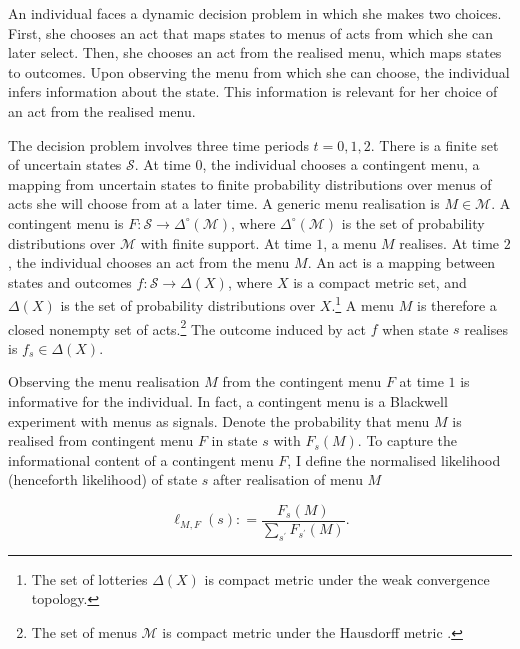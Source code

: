 An individual faces a dynamic decision problem in which she makes two choices. First, she chooses an act that maps states to menus of acts from which she can later select. Then, she chooses an act from the realised menu, which maps states to outcomes. Upon observing the menu from which she can choose, the individual infers information about the state. This information is relevant for her choice of an act from the realised menu.

The decision problem involves three time periods \( t = 0,1,2 \). There is a finite set of uncertain states \( \mathcal{S} \). At time \( 0 \), the individual chooses a contingent menu, a mapping from uncertain states to finite probability distributions over menus of acts she will choose from at a later time. A generic menu realisation is \( M \in \mathcal{M} \). A contingent menu is \( F: \mathcal{S} \rightarrow \Delta^{\circ} \left( \mathcal{M} \right) \), where \( \Delta^{\circ} \left( \mathcal{M} \right) \) is the set of probability distributions over \( \mathcal{M} \) with finite support. At time \( 1 \), a menu \( M \) realises. At time \( 2 \), the individual chooses an act from the menu \( M \). An act is a mapping between states and outcomes \( f : \mathcal{S} \rightarrow \Delta \left( X \right) \), where \( X \) is a compact metric set, and \( \Delta \left( X \right) \) is the set of probability distributions over \( X \).\footnote{The set of lotteries \(\Delta \left( X \right)\) is compact metric under the weak convergence topology.} A menu \( M \) is therefore a closed nonempty set of acts.\footnote{The set of menus \(\mathcal{M}\) is compact metric under the Hausdorff metric \citep[Theorem 3.85]{aliprantisInfiniteDimensionalAnalysis2006}.} The outcome induced by act \( f \) when state \( s \) realises is \( f_s \in \Delta \left( X \right) \).

Observing the menu realisation \( M \) from the contingent menu \( F \) at time \( 1 \) is informative for the individual. In fact, a contingent menu is a Blackwell experiment with menus as signals. Denote the probability that menu \( M \) is realised from contingent menu \( F \) in state \( s \) with \( F_s \left( M \right) \). To capture the informational content of a contingent menu \( F \), I define the normalised likelihood (henceforth likelihood) of state \(s\) after realisation of menu \(M\)

\begin{equation}\label{eq:likelihood}
	\ell_{M, F} \left( s \right) : = \frac{F_{s} \left( M \right)}{ \sum_{s^{\prime}} F_{s^{\prime}} \left( M \right)} .
\end{equation}

